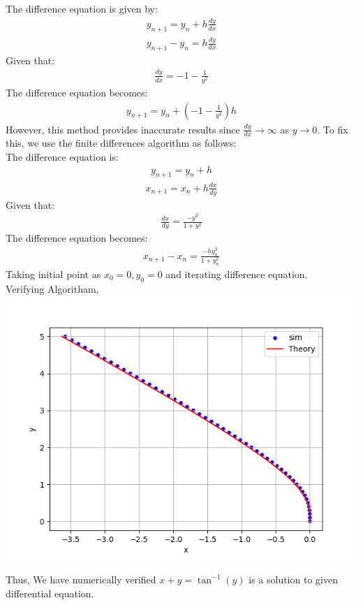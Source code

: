 \documentclass[journal]{IEEEtran}
\numberwithin{equation}{enumi}
\numberwithin{figure}{enumi}
\begin{document}
The difference equation is given by:
\begin{align}
y_{n+1} = y_{n} + h \frac{dy}{dx}
\end{align}
\begin{align}
y_{n+1} - y_{n} = h \frac{dy}{dx}
\end{align}
Given that:
\begin{align}
\frac{dy}{dx} = -1 - \frac{1}{y^2}
\end{align}
The difference equation becomes:
\begin{align}
y_{n+1} = y_{n} + (-1 - \frac{1}{y^2})h
\end{align}
However, this method provides inaccurate results since $ \frac{dy}{dx} \to \infty $ as $ y \to 0 $. To fix this, we use the finite differences algorithm as follows:\\
The difference equation is:
\begin{align}
y_{n+1} = y_{n} + h
\end{align}
\begin{align}
x_{n+1} = x_{n} + h \frac{dx}{dy}
\end{align}
Given that:
\begin{align}
\frac{dx}{dy} = \frac{-y^2}{1 + y^2}
\end{align}
The difference equation becomes:
\begin{align}
x_{n+1} - x_{n} = \frac{-h y^2_{n}}{1 + y^2_{n}}
\end{align}
Taking  initial point as $x_{0}=0, y_{0}=0$ and iterating difference equation.\\
Verifying Algoritham,\\
    \includegraphics[width=\columnwidth]{Figs/Figure_1.png} 

Thus, We have numerically verified $x+y=\tan^{-1}(y) $ is a solution to given differential equation.
\end{document}
